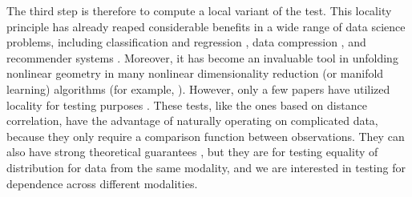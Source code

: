 \documentclass[11pt]{article}
\begin{document}
The third step is therefore to compute a local variant of the test.
This locality principle has already reaped considerable benefits in a wide range of data science problems, including  classification and regression  \cite{Stone1977}, data compression \cite{DaubechiesWaveletBook}, and recommender systems \cite{Sarwar2000}.
Moreover, it has become an invaluable tool in unfolding nonlinear geometry in many nonlinear dimensionality reduction (or manifold learning) algorithms (for example, \cite{
TorgersonBook, 
TenenbaumSilvaLangford2000, 
SaulRoweis2000, 
BelkinNiyogi2003,
DiffusionPNAS,
MMS:NoisyDictionaryLearning}). 
However, only a few papers have utilized locality for testing purposes \cite{David1966,Friedman1983,Schilling1986}.  These tests, like the ones based on distance correlation, have the advantage of naturally operating on complicated data, because they only require a comparison function between observations.  They can also have strong theoretical guarantees \cite{Maa1996}, but they are for testing equality of distribution for data from the same modality, and we are interested in testing for dependence across different modalities. 
\end{document}

